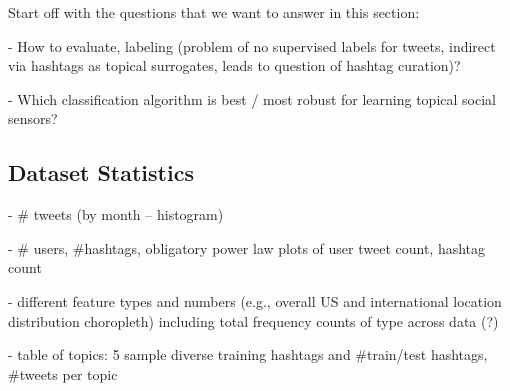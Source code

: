 \documentclass[letterpaper]{article}
\begin{document}
Start off with the questions that we want to answer in this section:

- How to evaluate, labeling (problem of no supervised labels for tweets, indirect via hashtags as topical surrogates, leads to question of hashtag curation)?

- Which classification algorithm is best / most robust for learning topical social sensors?

\subsection{Dataset Statistics}

- \# tweets (by month -- histogram)

- \# users, \#hashtags, obligatory power law plots of user tweet count, hashtag count

- different feature types and numbers (e.g., overall US and international location distribution choropleth) including total frequency counts of type across data (?)

- table of topics: 5 sample diverse training hashtags and \#train/test hashtags, \#tweets per topic
\end{document}
